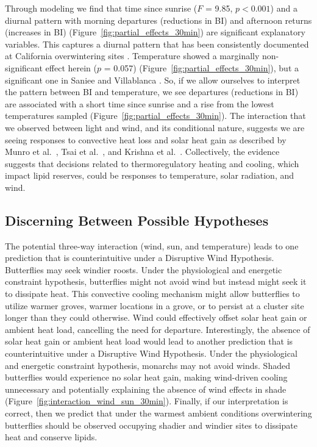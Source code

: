 \documentclass[insects,article,submit,pdftex,moreauthors]{Definitions/mdpi}
\begin{document}
Through modeling we find that time since sunrise ($F$ = 9.85, $p < 0.001$) and a diurnal pattern with morning departures (reductions in BI) and afternoon returns (increases in BI) (Figure~\ref{fig:partial_effects_30min}) are significant explanatory variables. This captures a diurnal pattern that has been consistently documented at California overwintering sites \cite{tuskesOverwinteringEcologyMonarch1978,chaplinEnergyReservesMetabolic1982}. Temperature showed a marginally non-significant effect herein ($p$ = 0.057) (Figure~\ref{fig:partial_effects_30min}), but a significant one in Saniee and Villablanca \cite{sanieeHierarchyScaleInfluence2022}. So, if we allow ourselves to interpret the pattern between BI and temperature, we see departures (reductions in BI) are associated with a short time since sunrise and a rise from the lowest temperatures sampled (Figure~\ref{fig:partial_effects_30min}). The interaction that we observed between light and wind, and its conditional nature, suggests we are seeing responses to convective heat loss and solar heat gain as described by Munro et al.\ \cite{munroClimateStrongPredictor2019}, Tsai et al.\ \cite{tsaiPhysicalBehavioralAdaptations2020}, and Krishna et al.\ \cite{krishnaAirTemperatureDrives2021}. Collectively, the evidence suggests that decisions related to thermoregulatory heating and cooling, which impact lipid reserves, could be responses to temperature, solar radiation, and wind.

\subsection{Discerning Between Possible Hypotheses}

The potential three-way interaction (wind, sun, and temperature) leads to one prediction that is counterintuitive under a Disruptive Wind Hypothesis. Butterflies may seek windier roosts. Under the physiological and energetic constraint hypothesis, butterflies might not avoid wind but instead might seek it to dissipate heat. This convective cooling mechanism might allow butterflies to utilize warmer groves, warmer locations in a grove, or to persist at a cluster site longer than they could otherwise. Wind could effectively offset solar heat gain or ambient heat load, cancelling the need for departure. Interestingly, the absence of solar heat gain or ambient heat load would lead to another prediction that is counterintuitive under a Disruptive Wind Hypothesis. Under the physiological and energetic constraint hypothesis, monarchs may not avoid winds. Shaded butterflies would experience no solar heat gain, making wind-driven cooling unnecessary and potentially explaining the absence of wind effects in shade (Figure~\ref{fig:interaction_wind_sun_30min}). Finally, if our interpretation is correct, then we predict that under the warmest ambient conditions overwintering butterflies should be observed occupying shadier and windier sites to dissipate heat and conserve lipids.
\end{document}
